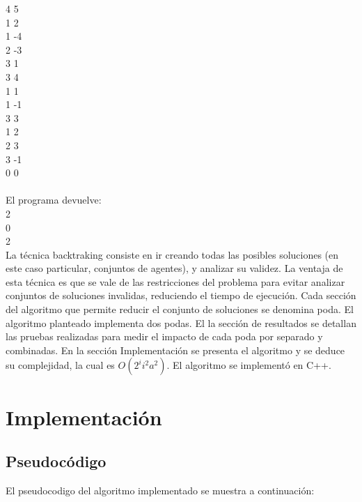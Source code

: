 \documentclass{article}
\begin{document}
4 5 \\
1 2 \\
1 -4 \\
2 -3 \\
3 1 \\
3 4 \\
1 1 \\
1 -1 \\
3 3 \\
1 2 \\
2 3 \\
3 -1 \\
0 0 \\ \\
El programa devuelve: \\
2 \\
0 \\
2 \\

La técnica backtraking consiste en ir creando todas las posibles soluciones (en este caso particular, conjuntos de agentes), y analizar su validez. La ventaja de esta técnica es que se vale de las restricciones del problema para evitar analizar conjuntos de soluciones invalidas, reduciendo el tiempo de ejecución. Cada sección del algoritmo que permite reducir el conjunto de soluciones se denomina poda. El algoritmo planteado implementa dos podas. El la sección de resultados se detallan las pruebas realizadas para medir el impacto de cada poda por separado y combinadas.
En la sección Implementación se presenta el algoritmo y se deduce su complejidad, la cual es $O(2^i i^2 a^2) $.
 El algoritmo se implementó en C++. 

\section{Implementación}

\subsection{Pseudocódigo}

El pseudocodigo del algoritmo implementado se muestra a continuación:
\end{document}

